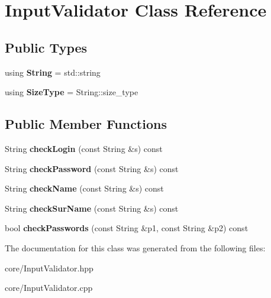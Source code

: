 \hypertarget{classInputValidator}{}\section{Input\+Validator Class Reference}
\label{classInputValidator}
\subsection*{Public Types}
\begin{DoxyCompactItemize}
\item 
using {\bfseries String} = std\+::string\hypertarget{classInputValidator_ae1b514f2142d2d9143f72263a7dfdeb9}{}\label{classInputValidator_ae1b514f2142d2d9143f72263a7dfdeb9}

\item 
using {\bfseries Size\+Type} = String\+::size\+\_\+type\hypertarget{classInputValidator_a87c54f8564a39c4c232cd7471f678ab8}{}\label{classInputValidator_a87c54f8564a39c4c232cd7471f678ab8}

\end{DoxyCompactItemize}
\subsection*{Public Member Functions}
\begin{DoxyCompactItemize}
\item 
String {\bfseries check\+Login} (const String \&s) const \hypertarget{classInputValidator_a10472eadee49f046399ee7b33f06e082}{}\label{classInputValidator_a10472eadee49f046399ee7b33f06e082}

\item 
String {\bfseries check\+Password} (const String \&s) const \hypertarget{classInputValidator_a08bdfb24b411d88d41038ab9de1ec552}{}\label{classInputValidator_a08bdfb24b411d88d41038ab9de1ec552}

\item 
String {\bfseries check\+Name} (const String \&s) const \hypertarget{classInputValidator_a184bdbb480cae0baced3682469bd762f}{}\label{classInputValidator_a184bdbb480cae0baced3682469bd762f}

\item 
String {\bfseries check\+Sur\+Name} (const String \&s) const \hypertarget{classInputValidator_a33d12bc5a29126372f457a145fb45d3c}{}\label{classInputValidator_a33d12bc5a29126372f457a145fb45d3c}

\item 
bool {\bfseries check\+Passwords} (const String \&p1, const String \&p2) const \hypertarget{classInputValidator_ad69a83aca08f144c23f41b914fe8c5cd}{}\label{classInputValidator_ad69a83aca08f144c23f41b914fe8c5cd}

\end{DoxyCompactItemize}


The documentation for this class was generated from the following files\+:\begin{DoxyCompactItemize}
\item 
core/Input\+Validator.\+hpp\item 
core/Input\+Validator.\+cpp\end{DoxyCompactItemize}

